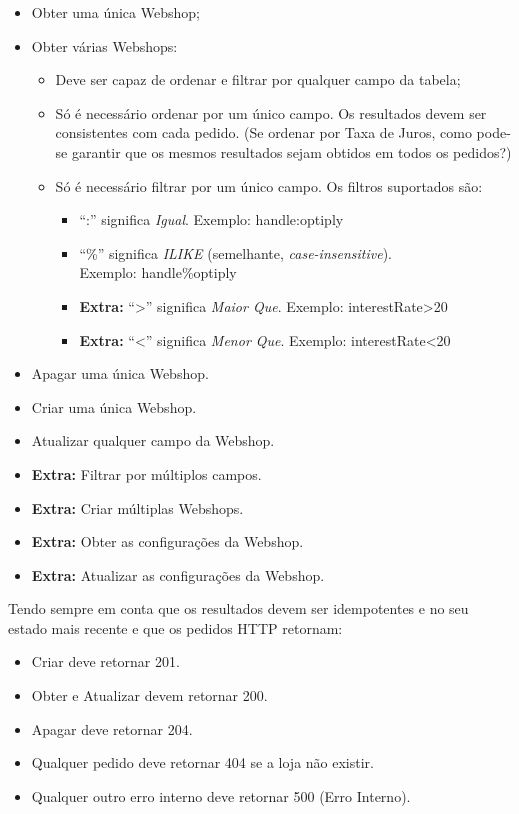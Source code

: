 \begin{itemize}
  \item Obter uma única Webshop;
  \item Obter várias Webshops:
        \begin{itemize}
          \item Deve ser capaz de ordenar e filtrar por qualquer campo da tabela;
          \item Só é necessário ordenar por um único campo. Os resultados devem ser consistentes com cada pedido. (Se ordenar por Taxa de Juros, como pode-se garantir que os mesmos resultados sejam obtidos em todos os pedidos?)
          \item Só é necessário filtrar por um único campo. Os filtros suportados são:
                \begin{itemize}
                  \item ``:'' significa \textit{Igual}. Exemplo: handle:optiply 
                  \item ``\%'' significa \textit{ILIKE} (semelhante, \textit{case-insensitive}).\\Exemplo: handle\%optiply
                  \item \textbf{Extra:} ``>'' significa \textit{Maior Que}. Exemplo: interestRate>20
                  \item \textbf{Extra:} ``<'' significa \textit{Menor Que}. Exemplo: interestRate<20
                \end{itemize}
        \end{itemize}
  \item Apagar uma única Webshop.
  \item Criar uma única Webshop.
  \item Atualizar qualquer campo da Webshop.
  \item \textbf{Extra:} Filtrar por múltiplos campos.
  \item \textbf{Extra:} Criar múltiplas Webshops.
  \item \textbf{Extra:} Obter as configurações da Webshop.
  \item \textbf{Extra:} Atualizar as configurações da Webshop.
\end{itemize}

Tendo sempre em conta que os resultados devem ser idempotentes e no seu estado mais recente e que os pedidos HTTP retornam:

\begin{itemize}
  \item Criar deve retornar 201.
  \item Obter e Atualizar devem retornar 200.
  \item Apagar deve retornar 204.
  \item Qualquer pedido deve retornar 404 se a loja não existir.
  \item Qualquer outro erro interno deve retornar 500 (Erro Interno).
\end{itemize}

